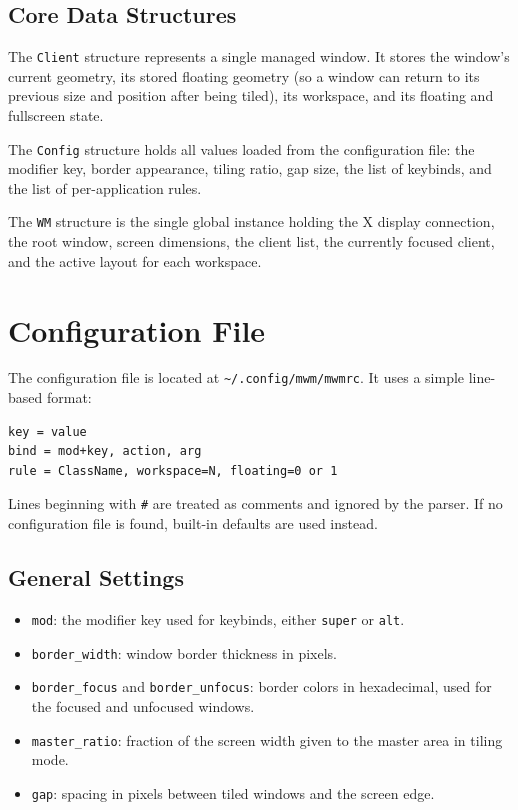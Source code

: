\documentclass[11pt,a4paper]{article}
\begin{document}
\subsection{Core Data Structures}

The \texttt{Client} structure represents a single managed window. It
stores the window's current geometry, its stored floating geometry (so a
window can return to its previous size and position after being tiled),
its workspace, and its floating and fullscreen state.

The \texttt{Config} structure holds all values loaded from the
configuration file: the modifier key, border appearance, tiling ratio,
gap size, the list of keybinds, and the list of per-application rules.

The \texttt{WM} structure is the single global instance holding the X
display connection, the root window, screen dimensions, the client list,
the currently focused client, and the active layout for each workspace.

\section{Configuration File}

The configuration file is located at \texttt{\textasciitilde/.config/mwm/mwmrc}.
It uses a simple line-based format:

\begin{lstlisting}
key = value
bind = mod+key, action, arg
rule = ClassName, workspace=N, floating=0 or 1
\end{lstlisting}

Lines beginning with \texttt{\#} are treated as comments and ignored by
the parser. If no configuration file is found, built-in defaults are
used instead.

\subsection{General Settings}

\begin{itemize}
  \item \texttt{mod}: the modifier key used for keybinds, either
        \texttt{super} or \texttt{alt}.
  \item \texttt{border\_width}: window border thickness in pixels.
  \item \texttt{border\_focus} and \texttt{border\_unfocus}: border colors
        in hexadecimal, used for the focused and unfocused windows.
  \item \texttt{master\_ratio}: fraction of the screen width given to the
        master area in tiling mode.
  \item \texttt{gap}: spacing in pixels between tiled windows and the
        screen edge.
\end{itemize}
\end{document}
